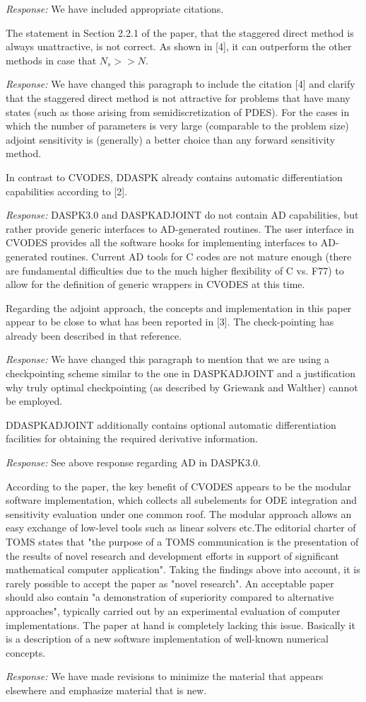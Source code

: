 {\em Response:}
We have included appropriate citations.

The statement in Section 2.2.1 of the paper, that the staggered direct
method is always unattractive, is not correct. As shown in [4], it can
outperform the other methods in case that $N_s >> N$.

{\em Response:}
We have changed this paragraph to include the citation [4] and 
clarify that the staggered direct method is not attractive for problems that 
have many states (such as those arising from semidiscretization of PDES).
For the cases in which the number of parameters is very large (comparable
to the problem size) adjoint sensitivity is (generally) a better choice than 
any forward sensitivity method.

In contrast to CVODES, DDASPK already contains automatic
differentiation capabilities according to [2].

{\em Response:} 
DASPK3.0 and DASPKADJOINT do not contain AD capabilities, but rather provide 
generic interfaces to AD-generated routines.
The user interface in CVODES provides all the software hooks for 
implementing interfaces to AD-generated routines. 
Current AD tools for C codes are not mature enough (there are fundamental 
difficulties due to the much higher flexibility of C vs. F77) to allow for 
the definition of generic wrappers in CVODES at this time.

Regarding the adjoint approach, the concepts and implementation in
this paper appear to be close to what has been reported in [3]. The
check-pointing has already been described in that reference.

{\em Response:}
We have changed this paragraph to mention that we are 
using a checkpointing scheme similar to the one in DASPKADJOINT
and a justification why truly optimal checkpointing (as described
by Griewank and Walther) cannot be employed.

DDASPKADJOINT additionally contains optional automatic differentiation
facilities for obtaining the required derivative information.

{\em Response:} 
See above response regarding AD in DASPK3.0.

According to the paper, the key benefit of CVODES appears to be the
modular software implementation, which collects all subelements for
ODE integration and sensitivity evaluation under one common roof. The
modular approach allows an easy exchange of low-level tools such as
linear solvers etc.The editorial charter of TOMS states that "the
purpose of a TOMS communication is the presentation of the results of
novel research and development efforts in support of significant
mathematical computer application". Taking the findings above into
account, it is rarely possible to accept the paper as "novel
research". An acceptable paper should also contain "a demonstration of
superiority compared to alternative approaches", typically carried out
by an experimental evaluation of computer implementations.  The paper
at hand is completely lacking this issue. Basically it is a
description of a new software implementation of well-known numerical
concepts.

{\em Response:}
We have made revisions to minimize the material that appears elsewhere
and emphasize material that is new.


